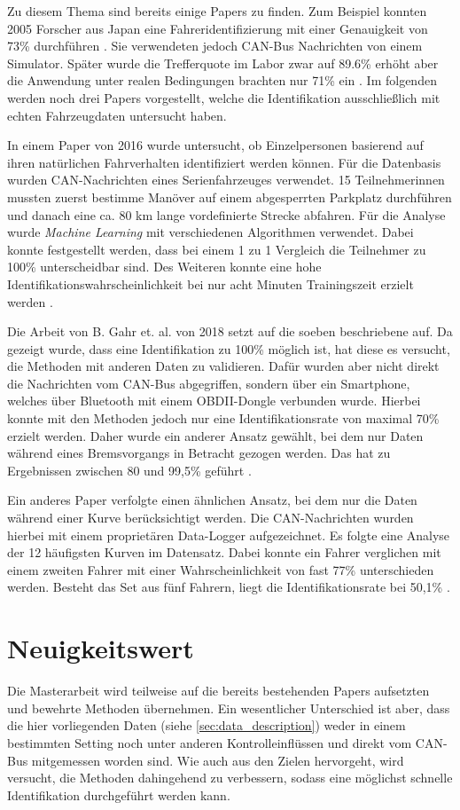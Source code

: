 Zu diesem Thema sind bereits einige Papers zu finden. Zum Beispiel konnten 2005 Forscher aus Japan eine Fahreridentifizierung mit einer Genauigkeit von 73\% durchführen \cite{Wakita2005}. Sie verwendeten jedoch CAN-Bus Nachrichten von einem Simulator. Später wurde die Trefferquote im Labor zwar auf 89.6\% erhöht aber die Anwendung unter realen Bedingungen brachten nur 71\% ein \cite{Miyajima2007}. Im folgenden werden noch drei Papers vorgestellt, welche die Identifikation ausschließlich mit echten Fahrzeugdaten untersucht haben.

In einem Paper von 2016 wurde untersucht, ob Einzelpersonen basierend auf ihren natürlichen Fahrverhalten identifiziert werden können. Für die Datenbasis wurden CAN-Nachrichten eines Serienfahrzeuges verwendet. 15 Teilnehmerinnen mussten zuerst bestimme Manöver auf einem abgesperrten Parkplatz durchführen und danach eine ca. 80 km lange vordefinierte Strecke abfahren. Für die Analyse wurde \textit{Machine Learning} mit verschiedenen Algorithmen verwendet. Dabei konnte festgestellt werden, dass bei einem 1 zu 1 Vergleich die Teilnehmer zu 100\% unterscheidbar sind. Des Weiteren konnte eine hohe Identifikationswahrscheinlichkeit bei nur acht Minuten Trainingszeit erzielt werden \cite{Enev2016}.

Die Arbeit von B. Gahr et. al. von 2018 setzt auf die soeben beschriebene auf. Da gezeigt wurde, dass eine Identifikation zu 100\% möglich ist, hat diese es versucht, die Methoden mit anderen Daten zu validieren. Dafür wurden aber nicht direkt die Nachrichten vom CAN-Bus abgegriffen, sondern über ein Smartphone, welches über Bluetooth mit einem OBDII-Dongle verbunden wurde. Hierbei konnte mit den Methoden jedoch nur eine Identifikationsrate von maximal 70\% erzielt werden. Daher wurde ein anderer Ansatz gewählt, bei dem nur Daten während eines Bremsvorgangs in Betracht gezogen werden. Das hat zu Ergebnissen zwischen 80 und 99,5\% geführt \cite{Gahr2018}.

Ein anderes Paper verfolgte einen ähnlichen Ansatz, bei dem nur die Daten während einer Kurve berücksichtigt werden. Die CAN-Nachrichten wurden hierbei mit einem proprietären Data-Logger aufgezeichnet. Es folgte eine Analyse der 12 häufigsten Kurven im Datensatz. Dabei konnte ein Fahrer verglichen mit einem zweiten Fahrer mit einer Wahrscheinlichkeit von fast 77\% unterschieden werden. Besteht das Set aus fünf Fahrern, liegt die Identifikationsrate bei 50,1\% \cite{Hallac2016}.

\section{Neuigkeitswert}
\label{sec:novelty}

Die Masterarbeit wird teilweise auf die bereits bestehenden Papers aufsetzten und bewehrte Methoden übernehmen. Ein wesentlicher Unterschied ist aber, dass die hier vorliegenden Daten (siehe \ref{sec:data_description}) weder in einem bestimmten Setting noch unter anderen Kontrolleinflüssen und direkt vom CAN-Bus mitgemessen worden sind. Wie auch aus den Zielen hervorgeht, wird versucht, die Methoden dahingehend zu verbessern, sodass eine möglichst schnelle Identifikation durchgeführt werden kann.